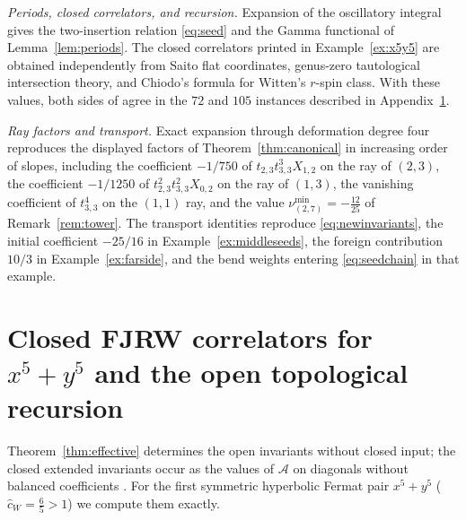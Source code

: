 \documentclass[11pt]{amsart}
\theoremstyle{definition}
\theoremstyle{remark}
\newcommand{\chat}{\hat{c}}
\newcommand{\Ascr}{\mathcal{A}}
\begin{document}
\emph{Periods, closed correlators, and recursion.}
Expansion of the oscillatory integral gives the two-insertion relation
\eqref{eq:seed} and the Gamma functional of Lemma~\ref{lem:periods}.
The closed correlators printed in Example~\ref{ex:x5y5} are obtained
independently from Saito flat coordinates, genus-zero tautological
intersection theory, and Chiodo's formula for Witten's $r$-spin class.  With
these values, both sides of \cite[Thm.~0.5]{GKT} agree in the $72$ and $105$
instances described in Appendix~\ref{sec:x5y5}.

\emph{Ray factors and transport.}
Exact expansion through deformation degree four reproduces the displayed
factors of Theorem~\ref{thm:canonical} in increasing order of slopes,
including the coefficient $-1/750$ of $t_{2,3}t_{3,3}^3X_{1,2}$ on the ray of
$(2,3)$, the coefficient $-1/1250$ of $t_{2,3}^2t_{3,3}^2X_{0,2}$ on the ray
of $(1,3)$, the vanishing coefficient of $t_{3,3}^4$ on the $(1,1)$ ray, and
the value $\nu^{\min}_{(2,7)}=-\tfrac{12}{25}$ of Remark~\ref{rem:tower}.
The transport identities reproduce \eqref{eq:newinvariants}, the initial
coefficient $-25/16$ in Example~\ref{ex:middleseeds}, the foreign
contribution $10/3$ in Example~\ref{ex:farside}, and the bend weights
entering \eqref{eq:seedchain} in that example.

\appendix

\section{Closed FJRW correlators for
\texorpdfstring{$x^{5}+y^{5}$}{x5+y5} and the open topological recursion}
\label{sec:x5y5}

Theorem~\ref{thm:effective} determines the open invariants without closed
input; the closed extended invariants occur as the values of $\Ascr$ on
diagonals without balanced coefficients \cite[Cor.~5.11(3)]{GKT}.  For the
first symmetric hyperbolic Fermat pair $x^{5}+y^{5}$ ($\chat_{W}=\tfrac65>1$)
we compute them exactly.
\end{document}
